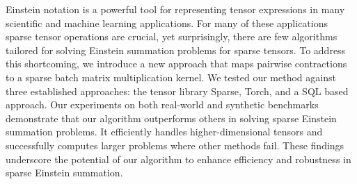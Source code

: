 Einstein notation is a powerful tool for representing tensor expressions in many scientific and
machine learning applications. For many of these applications sparse tensor operations are crucial,
yet surprisingly, there are few algorithms tailored for solving Einstein summation problems for sparse tensors.
To address this shortcoming, we introduce a new approach that maps pairwise contractions to a
sparse batch matrix multiplication kernel. We tested our method against three established approaches:
the tensor library Sparse, Torch, and a SQL based approach. Our experiments on both real-world and
synthetic benchmarks demonstrate that our algorithm outperforms others in solving sparse Einstein 
summation problems. It efficiently handles higher-dimensional tensors and successfully computes 
larger problems where other methods fail. These findings underscore the potential of our algorithm 
to enhance efficiency and robustness in sparse Einstein summation.